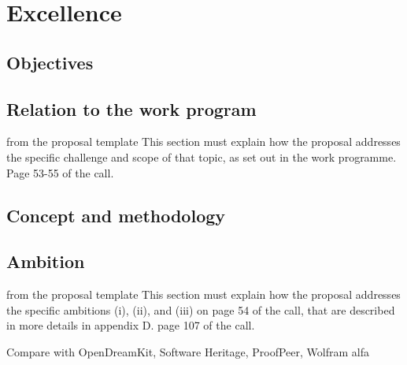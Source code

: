 \chapter{Excellence}


\section{Objectives}


\section{Relation to the work program}
\begin{todo}{from the proposal template}\color{red}
  This section must explain how the proposal addresses the specific challenge and scope of
  that topic, as set out in the work programme. Page 53-55 of the call.
\end{todo}


\section{Concept and methodology}


\section{Ambition}
\begin{todo}{from the proposal template}\color{red}
  This section must explain how the proposal addresses the specific ambitions (i), (ii),
  and (iii) on page 54 of the call, that are described in more details in appendix D. page
  107 of the call.
\end{todo}
\newpage 

{\color{red} Compare with OpenDreamKit, Software Heritage, ProofPeer,
  Wolfram alfa}






